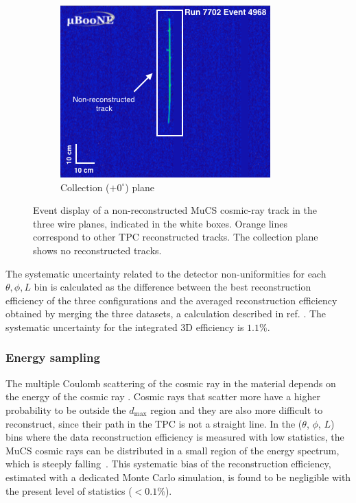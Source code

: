 \documentclass[a4paper,11pt]{article}
\begin{document}
\begin{figure}[htbp]
\begin{center}
    \begin{subfigure}{0.3\textwidth}
      \includegraphics[width=\linewidth]{figures/y.png}
      \caption{Collection ($+0^{\circ}$) plane} \label{fig:y}
    \end{subfigure}    \caption{Event display of a non-reconstructed MuCS cosmic-ray track in the three wire planes, indicated in the white boxes. Orange lines correspond to other TPC reconstructed tracks. The collection plane shows no reconstructed tracks.} \label{fig:example}
  \end{center}
\end{figure}

The systematic uncertainty related to the detector non-uniformities for each $\theta,\phi,L$ bin is calculated as the difference between the best reconstruction efficiency of the three configurations and the averaged reconstruction efficiency obtained by merging the three datasets, a calculation described in ref. \cite{besiii}. The systematic uncertainty for the integrated 3D efficiency is $1.1\%$.

\subsubsection{Energy sampling}
The multiple Coulomb scattering of the cosmic ray in the material depends on the energy of the cosmic ray \cite{pdg}. Cosmic rays that scatter more have a higher probability to be outside the $d_{\mathrm{max}}$ region and they are also more difficult to reconstruct, since their path in the TPC is not a straight line. In the ($\theta$, $\phi$, $L$) bins where the data reconstruction efficiency is measured with low statistics, the MuCS cosmic rays can be distributed in a small region of the energy spectrum, which is steeply falling~\cite{corsika}. This systematic bias of the reconstruction efficiency, estimated with a dedicated Monte Carlo simulation, is found to be negligible with the present level of statistics ($<0.1\%$).
\end{document}
